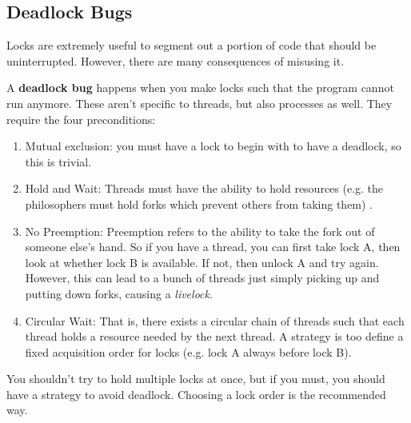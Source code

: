 \documentclass{article}
\newcounter{definition}[section]
\newcounter{code}[section]
\begin{document}
  \subsection{Deadlock Bugs}

    Locks are extremely useful to segment out a portion of code that should be uninterrupted. However, there are many consequences of misusing it. 

    \begin{definition}
      \label{def:deadlock-bugs}
      A \textbf{deadlock bug} happens when you make locks such that the program cannot run anymore. These aren't specific to threads, but also processes as well. They require the four preconditions: 
      \begin{enumerate}
        \item Mutual exclusion: you must have a lock to begin with to have a deadlock, so this is trivial. 
        \item Hold and Wait: Threads must have the ability to hold resources (e.g. the philosophers must hold forks which prevent others from taking them) . 
        \item No Preemption: Preemption refers to the ability to take the fork out of someone else's hand. So if you have a thread, you can first take lock A, then look at whether lock B is available. If not, then unlock A and try again. However, this can lead to a bunch of threads just simply picking up and putting down forks, causing a \textit{livelock}. 
        \item Circular Wait: That is, there exists a circular chain of threads such that each thread holds a resource needed by the next thread. A strategy is too define a fixed acquisition order for locks (e.g. lock A always before lock B). 
      \end{enumerate}
      You shouldn't try to hold multiple locks at once, but if you must, you should have a strategy to avoid deadlock. Choosing a lock order is the recommended way. 
    \end{definition}
\end{document}
